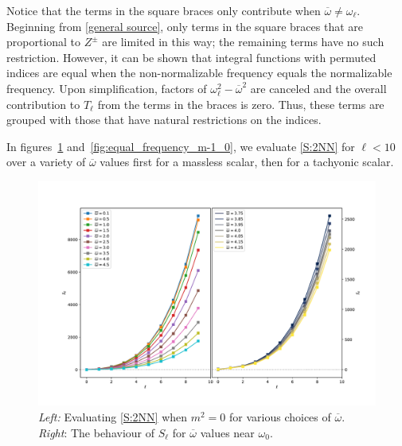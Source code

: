\documentclass[letterpaper,11pt]{article}
\newcommand{\ol}{\omega_\ell}
\newcommand{\ob}{\overline{\omega}}
\begin{document}
Notice that the terms in the square braces only contribute when $\ob \neq \ol$. Beginning from \eqref{general source}, only terms in the square braces that are proportional to $Z^{\pm}$ are limited in this way; the remaining terms have no such restriction. However, it can be shown that integral functions with permuted indices are equal when the non-normalizable frequency equals the normalizable frequency. Upon simplification, factors of $\ol^2 - \ob^2$ are canceled and the overall contribution to $T_{\ell}$ from the terms in the braces is zero. Thus, these terms are grouped with those that have natural restrictions on the indices. 

In figures~\ref{fig:equal_frequency_m0} and~\ref{fig:equal_frequency_m-1_0}, we evaluate \eqref{S:2NN} for $\ell < 10$ over a variety of $\ob$ values first for a massless scalar, then for a tachyonic scalar.

\begin{figure}
\centering
\includegraphics[width=\textwidth]{./figures/NN_equalfreq_sourceterms_m0_0+zoom}
\caption{{\it Left:} Evaluating \eqref{S:2NN} when $m^2 = 0$ for various choices of $\ob$. {\it Right}: The behaviour of $S_\ell$ for $\ob$ values near $\omega_0$.}
\label{fig:equal_frequency_m0}
\end{figure}
\end{document}
